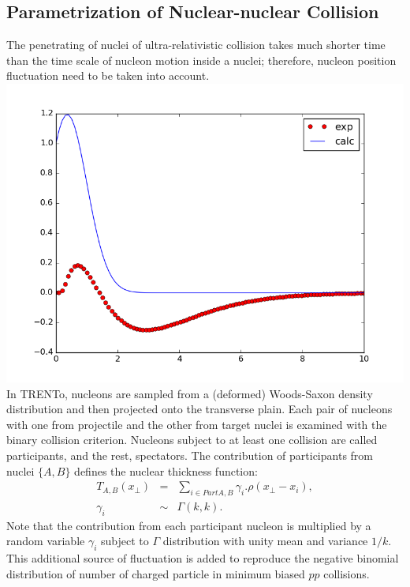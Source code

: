 \documentclass[aps,prl,twocolumn,groupedaddress]{revtex4-1}
\begin{document}
	\subsection{Parametrization of Nuclear-nuclear Collision}
	The penetrating of nuclei of ultra-relativistic collision takes much shorter time than the time scale of nucleon motion inside a nuclei; therefore, nucleon position fluctuation need to be taken into account. 
	\includegraphics[width=\columnwidth]{pics/place_holder.png}
	In TRENTo, nucleons are sampled from a (deformed) Woods-Saxon density distribution and then projected onto the transverse plain. 
	Each pair of nucleons with one from projectile and the other from target nuclei is examined with the binary collision criterion. 
	Nucleons subject to at least one collision are called participants, and the rest, spectators.
	The contribution of participants from nuclei $\{A,B\}$ defines the nuclear thickness function:
	\begin{eqnarray}
		T_{A,B}(x_\perp) &=& \sum_{i \in Part A,B} \gamma_i. \rho(x_\perp- x_i), \\
		\gamma_i &\sim& \Gamma(k, k).
	\end{eqnarray}
	Note that the contribution from each participant nucleon is multiplied by a random variable $\gamma_i$ subject to $\Gamma$ distribution with unity mean and variance $1/k$. 
	This additional source of fluctuation is added to reproduce the negative binomial distribution of number of charged particle in minimum biased $pp$ collisions.
\end{document}
